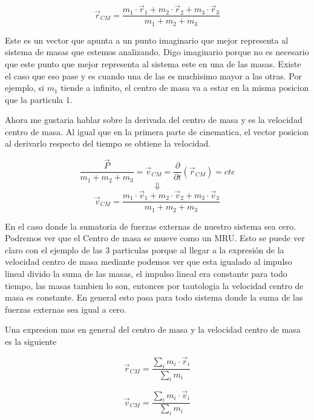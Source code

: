 \documentclass[../Main.tex]{subfiles}
\begin{document}
\begin{minipage}[t]{0.6\textwidth}
\begin{equation}
    \vec{r} _{CM} = \frac{m_1 \cdot \vec{r} _1 + m_2 \cdot \vec{r} _2 + m_3 \cdot \vec{r} _3}{m_1 + m_2 + m_3}
    \label{eq:rc}
\end{equation}

Este es un vector que apunta a un punto imaginario que mejor representa al
sistema de masas que estemos analizando. Digo imaginario porque no es
necesario que este punto que mejor representa al sistema este en una de las
masas. Existe el caso que eso pase y es cuando una de las es muchisimo mayor
a las otras. Por ejemplo, si $m_1$ tiende a infinito, el centro de masa
va a estar en la misma posicion que la particula 1.

Ahora me gustaria hablar sobre la derivada del centro de masa y es la velocidad
centro de masa. Al igual que en la primera parte de cinematica, el vector
posicion al derivarlo respecto del tiempo se obtiene la velocidad.

\begin{equation*}
    \frac{\vec{P}}{m_1 + m_2 + m_3} = \vec{v}_{CM} = \frac{\partial}{\partial t} \left(\vec{r} _{CM}\right) = cte
\end{equation*}
\begin{equation*}
    \Downarrow
\end{equation*}
\begin{equation}
    \vec{v}_{CM} = \frac{m_1 \cdot \vec{v} _1 + m_2 \cdot \vec{v} _2 + m_3 \cdot \vec{v} _3}{m_1 + m_2 + m_3}
    \label{eq:vc}
\end{equation}

\end{minipage}
\newpage
\begin{minipage}[t]{0.3\textwidth}
\end{minipage}
\hfill
\begin{minipage}[t]{0.6\textwidth}

En el caso donde la sumatoria de fuerzas externas de nuestro sistema sea cero.
Podremos ver que el Centro de masa se mueve como un MRU. Esto se puede ver
claro con el ejemplo de las 3 particulas porque al llegar a la expresión de
la velocidad centro de masa mediante podemos ver que esta igualado al impulso
lineal divido la suma de las masas, el impulso lineal era constante para todo
tiempo, las masas tambien lo son, entonces por tautologia la velocidad centro
de masa es constante. En general esto pasa para todo sistema donde la suma
de las fuerzas externas sea igual a cero.

Una expresion mas en general del centro de masa y la velocidad centro de masa
es la siguiente

\begin{equation*}
    \vec{r} _{CM} = \frac{\sum _i m_i \cdot \vec{r} _i}{\sum _i m_i}
\end{equation*}

\begin{equation*}
    \vec{v} _{CM} = \frac{\sum _i m_i \cdot \vec{v} _i}{\sum _i m_i}
\end{equation*}
\end{minipage}
\end{document}
